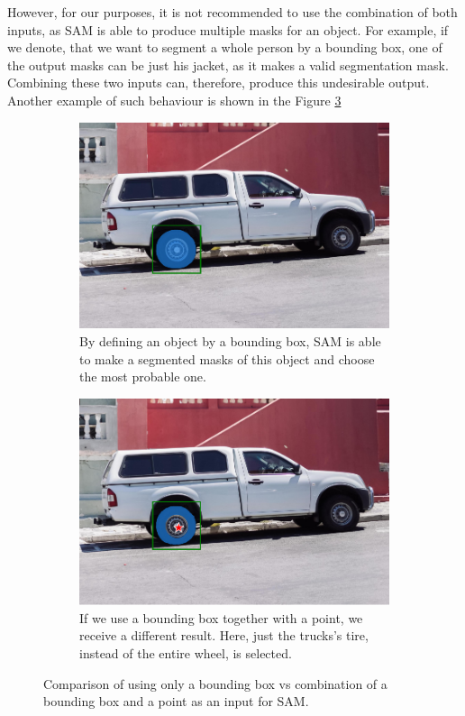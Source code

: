 However, for our purposes, it is not recommended
to use the combination of both inputs, as SAM is able to produce multiple masks for an object. For example, if we
denote, that we want to segment a whole person by a bounding box, one of the output masks can be just his jacket, as it
makes a
valid segmentation mask. Combining these two inputs can, therefore, produce this undesirable output. Another
example of
such
behaviour
is shown in the Figure \ref{fig:sam_examples}
\begin{figure}[htbp]
  \centering
  \begin{subfigure}[h]{0.48\textwidth}
    \centering
    \includegraphics[width=\textwidth]{text/chapter_04/imgs/SAM_box}
    \caption{By defining an object by a bounding box, SAM is able to make a segmented masks of this object and choose
    the most probable one.}
    \label{fig:sam_box}
  \end{subfigure}
  \hfill
  \begin{subfigure}[h]{0.48\textwidth}
    \centering
    \includegraphics[width=\textwidth]{text/chapter_04/imgs/SAM_box_point}
    \caption{If we use a bounding box together with a point, we receive a different result. Here, just the trucks's
    tire, instead of the entire wheel, is selected.}
    \label{fig:sam_boxPoint}
  \end{subfigure}
  \caption{Comparison of using only a bounding box vs combination of a bounding box and a point as an input for SAM.}
  \label{fig:sam_examples}
\end{figure}

